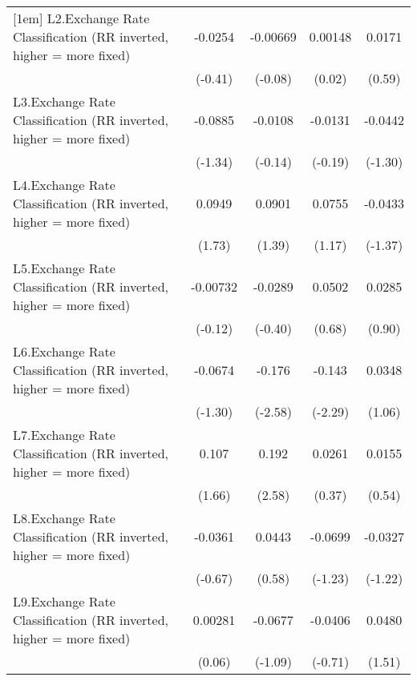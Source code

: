 {\begin{longtable}{l*{4}{c}}
[1em]
L2.Exchange Rate Classification (RR inverted, higher = more fixed)&  -0.0254         & -0.00669         &  0.00148         &   0.0171         \\
                &  (-0.41)         &  (-0.08)         &   (0.02)         &   (0.59)         \\
[1em]
L3.Exchange Rate Classification (RR inverted, higher = more fixed)&  -0.0885         &  -0.0108         &  -0.0131         &  -0.0442         \\
                &  (-1.34)         &  (-0.14)         &  (-0.19)         &  (-1.30)         \\
[1em]
L4.Exchange Rate Classification (RR inverted, higher = more fixed)&   0.0949         &   0.0901         &   0.0755         &  -0.0433         \\
                &   (1.73)         &   (1.39)         &   (1.17)         &  (-1.37)         \\
[1em]
L5.Exchange Rate Classification (RR inverted, higher = more fixed)& -0.00732         &  -0.0289         &   0.0502         &   0.0285         \\
                &  (-0.12)         &  (-0.40)         &   (0.68)         &   (0.90)         \\
[1em]
L6.Exchange Rate Classification (RR inverted, higher = more fixed)&  -0.0674         &   -0.176\sym{**} &   -0.143\sym{*}  &   0.0348         \\
                &  (-1.30)         &  (-2.58)         &  (-2.29)         &   (1.06)         \\
[1em]
L7.Exchange Rate Classification (RR inverted, higher = more fixed)&    0.107         &    0.192\sym{**} &   0.0261         &   0.0155         \\
                &   (1.66)         &   (2.58)         &   (0.37)         &   (0.54)         \\
[1em]
L8.Exchange Rate Classification (RR inverted, higher = more fixed)&  -0.0361         &   0.0443         &  -0.0699         &  -0.0327         \\
                &  (-0.67)         &   (0.58)         &  (-1.23)         &  (-1.22)         \\
[1em]
L9.Exchange Rate Classification (RR inverted, higher = more fixed)&  0.00281         &  -0.0677         &  -0.0406         &   0.0480         \\
                &   (0.06)         &  (-1.09)         &  (-0.71)         &   (1.51)         \\

\end{longtable}}
